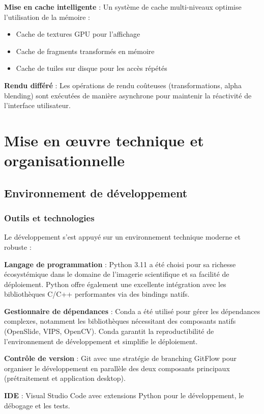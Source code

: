 \documentclass[12pt,a4paper]{report}
\begin{document}
\textbf{Mise en cache intelligente} : Un système de cache multi-niveaux optimise l'utilisation de la mémoire :
\begin{itemize}
\item Cache de textures GPU pour l'affichage
\item Cache de fragments transformés en mémoire
\item Cache de tuiles sur disque pour les accès répétés
\end{itemize}

\textbf{Rendu différé} : Les opérations de rendu coûteuses (transformations, alpha blending) sont exécutées de manière asynchrone pour maintenir la réactivité de l'interface utilisateur.

\section{Mise en œuvre technique et organisationnelle}

\subsection{Environnement de développement}

\subsubsection{Outils et technologies}

Le développement s'est appuyé sur un environnement technique moderne et robuste :

\textbf{Langage de programmation} : Python 3.11 a été choisi pour sa richesse écosystémique dans le domaine de l'imagerie scientifique et sa facilité de déploiement. Python offre également une excellente intégration avec les bibliothèques C/C++ performantes via des bindings natifs.

\textbf{Gestionnaire de dépendances} : Conda a été utilisé pour gérer les dépendances complexes, notamment les bibliothèques nécessitant des composants natifs (OpenSlide, VIPS, OpenCV). Conda garantit la reproductibilité de l'environnement de développement et simplifie le déploiement.

\textbf{Contrôle de version} : Git avec une stratégie de branching GitFlow pour organiser le développement en parallèle des deux composants principaux (prétraitement et application desktop).

\textbf{IDE} : Visual Studio Code avec extensions Python pour le développement, le débogage et les tests.
\end{document}
